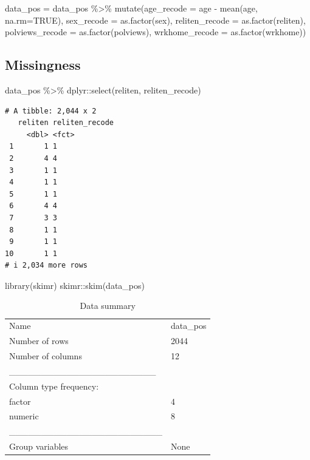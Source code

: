 \documentclass[
  letterpaper,
  DIV=11,
  numbers=noendperiod]{scrartcl}
\newenvironment{Shaded}{\begin{snugshade}}{\end{snugshade}}
\newcommand{\AttributeTok}[1]{\textcolor[rgb]{0.40,0.45,0.13}{#1}}
\newcommand{\ConstantTok}[1]{\textcolor[rgb]{0.56,0.35,0.01}{#1}}
\newcommand{\FunctionTok}[1]{\textcolor[rgb]{0.28,0.35,0.67}{#1}}
\newcommand{\NormalTok}[1]{\textcolor[rgb]{0.00,0.23,0.31}{#1}}
\newcommand{\OtherTok}[1]{\textcolor[rgb]{0.00,0.23,0.31}{#1}}
\newcommand{\SpecialCharTok}[1]{\textcolor[rgb]{0.37,0.37,0.37}{#1}}
\begin{document}
\begin{Shaded}
\begin{Highlighting}[]
\NormalTok{data\_pos }\OtherTok{=}\NormalTok{ data\_pos }\SpecialCharTok{\%\textgreater{}\%}
  \FunctionTok{mutate}\NormalTok{(}\AttributeTok{age\_recode =}\NormalTok{ age }\SpecialCharTok{{-}} \FunctionTok{mean}\NormalTok{(age, }\AttributeTok{na.rm=}\ConstantTok{TRUE}\NormalTok{),}
         \AttributeTok{sex\_recode =} \FunctionTok{as.factor}\NormalTok{(sex),}
         \AttributeTok{reliten\_recode =} \FunctionTok{as.factor}\NormalTok{(reliten),}
         \AttributeTok{polviews\_recode =} \FunctionTok{as.factor}\NormalTok{(polviews),}
         \AttributeTok{wrkhome\_recode =} \FunctionTok{as.factor}\NormalTok{(wrkhome))}
\end{Highlighting}
\end{Shaded}

\subsection{Missingness}\label{missingness}

\begin{Shaded}
\begin{Highlighting}[]
\NormalTok{data\_pos }\SpecialCharTok{\%\textgreater{}\%}
\NormalTok{  dplyr}\SpecialCharTok{::}\FunctionTok{select}\NormalTok{(reliten, reliten\_recode)}
\end{Highlighting}
\end{Shaded}

\begin{verbatim}
# A tibble: 2,044 x 2
   reliten reliten_recode
     <dbl> <fct>         
 1       1 1             
 2       4 4             
 3       1 1             
 4       1 1             
 5       1 1             
 6       4 4             
 7       3 3             
 8       1 1             
 9       1 1             
10       1 1             
# i 2,034 more rows
\end{verbatim}

\begin{Shaded}
\begin{Highlighting}[]
\FunctionTok{library}\NormalTok{(skimr)}
\NormalTok{skimr}\SpecialCharTok{::}\FunctionTok{skim}\NormalTok{(data\_pos)}
\end{Highlighting}
\end{Shaded}

\begin{longtable}[]{@{}ll@{}}
\caption{Data summary}\tabularnewline
\toprule\noalign{}
\endfirsthead
\endhead
\bottomrule\noalign{}
\endlastfoot
Name & data\_pos \\
Number of rows & 2044 \\
Number of columns & 12 \\
\_\_\_\_\_\_\_\_\_\_\_\_\_\_\_\_\_\_\_\_\_\_\_ & \\
Column type frequency: & \\
factor & 4 \\
numeric & 8 \\
\_\_\_\_\_\_\_\_\_\_\_\_\_\_\_\_\_\_\_\_\_\_\_\_ & \\
Group variables & None \\
\end{longtable}
\end{document}
